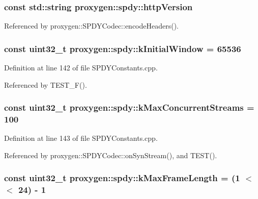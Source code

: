 \subsubsection[{http\+Version}]{\setlength{\rightskip}{0pt plus 5cm}const std\+::string proxygen\+::spdy\+::http\+Version}\label{namespaceproxygen_1_1spdy_a59f207220b2fa6bb93f0822ddc0add1d}


Referenced by proxygen\+::\+S\+P\+D\+Y\+Codec\+::encode\+Headers().

\subsubsection[{k\+Initial\+Window}]{\setlength{\rightskip}{0pt plus 5cm}const uint32\+\_\+t proxygen\+::spdy\+::k\+Initial\+Window = 65536}\label{namespaceproxygen_1_1spdy_aaaff7f359fcc0ce69e8e1a3964c32376}


Definition at line 142 of file S\+P\+D\+Y\+Constants.\+cpp.



Referenced by T\+E\+S\+T\+\_\+\+F().

\subsubsection[{k\+Max\+Concurrent\+Streams}]{\setlength{\rightskip}{0pt plus 5cm}const uint32\+\_\+t proxygen\+::spdy\+::k\+Max\+Concurrent\+Streams = 100}\label{namespaceproxygen_1_1spdy_ac11c0debec19c3db427516f40c5acbed}


Definition at line 143 of file S\+P\+D\+Y\+Constants.\+cpp.



Referenced by proxygen\+::\+S\+P\+D\+Y\+Codec\+::on\+Syn\+Stream(), and T\+E\+S\+T().

\subsubsection[{k\+Max\+Frame\+Length}]{\setlength{\rightskip}{0pt plus 5cm}const uint32\+\_\+t proxygen\+::spdy\+::k\+Max\+Frame\+Length = (1 $<$$<$ 24) -\/ 1}\label{namespaceproxygen_1_1spdy_aa2923ca43517a52d7c833701ffc50014}


